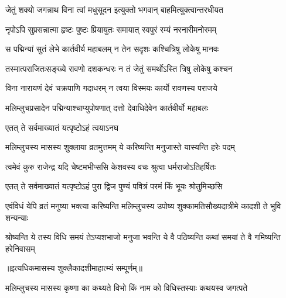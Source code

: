 \twolineshloka
{जेतुं शक्यो जगन्नाथ विना त्वां मधुसूदन}
{इत्युक्तो भगवान् बाहमित्युक्त्वान्तरधीयत} %

\twolineshloka
{नृपोऽपि सुप्रसन्नात्मा हृष्टः पुष्टः प्रियायुतः}
{समायात् स्वपुरं रम्यं नरनारीमनोरमम्} %

\twolineshloka
{स पद्मिन्यां सुतं लेभे कार्तवीर्य महाबलम्}
{न तेन सदृशः कश्चित्रिषु लोकेषु मानवः} %

\twolineshloka
{तस्मात्पराजितःसङ्ख्ये रावणो दशकन्धरः}
{न तं जेतुं समर्थोऽस्ति त्रिषु लोकेषु कश्चन} %

\twolineshloka
{विना नारायणं देवं चक्रपाणि गदाधरम्}
{न त्वया विस्मयः कार्यो रावणस्य पराजये} %

\twolineshloka
{मलिम्लुचप्रसादेन पद्मिन्याश्चाप्युपोषणात्}
{दत्तो देवाधिदेवेन कार्तवीर्यो महाबलः} %



\onelineshloka
{एतत् ते सर्वमाख्यातं यत्पृष्टोऽहं त्वयाऽनघ} %

\twolineshloka
{मलिम्लुचस्य मासस्य शुक्लाया व्रतमुत्तमम्}
{ये करिष्यन्ति मनुजास्ते यास्यन्ति हरेः पदम्} %

\twolineshloka
{त्वमेवं कुरु राजेन्द्र यदि चेष्टमभीप्ससि}
{केशवस्य वचः श्रुत्वा धर्मराजोऽतिहर्षितः} %



\twolineshloka
{एतत् ते सर्वमाख्यातं यत्पृष्टोऽहं पुरा द्विज}
{पुण्यं पवित्रं परमं किं भूयः श्रोतुमिच्छसि} %

\twolineshloka
{एवंविधं येपि व्रतं मनुष्या भक्त्या करिष्यन्ति मलिम्लुचस्य}
{उपोष्य शुक्कामतिसौख्यदात्रीमे कादशी ते भुवि शन्यन्याः} %

\twolineshloka
{श्रोष्यन्ति ये तस्य विधि समयं तेऽप्यशभाजो मनुजा भवन्ति}
{ये वै पठिष्यन्ति कथां समयां ते वै गमिष्यन्ति हरेनिवासम्} %

॥इत्यधिकमासस्य शुक्लैकादशीमाहात्म्यं सम्पूर्णम्॥

\hyperref[sec:ekadashi_mahatmyam_vrata_raja]{\closesub}
\clearpage

\label{sec:vrata-raja-purushottama-krishna-parama}


\twolineshloka
{मलिम्लुचस्य मासस्य कृष्णा का कथ्यते विभो}
{किं नाम को विधिस्तस्याः कथयस्व जगत्पते} %

